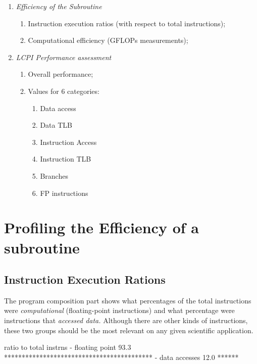 \begin{enumerate}
  \item  \emph{Efficiency of the Subroutine}
  \begin{enumerate}
    \item Instruction execution ratios (with respect to total instructions);
    \item  Computational efficiency (GFLOPs measurements);
  \end{enumerate}
  \item  \emph{LCPI Performance assessment}
  \begin{enumerate}
    \item Overall performance;
    \item  Values for 6 categories:
    \begin{enumerate}
      \item  Data access
      \item  Data TLB
      \item  Instruction Access
      \item  Instruction TLB
      \item  Branches
      \item  FP instructions
    \end{enumerate}
  \end{enumerate}
\end{enumerate}

\section{Profiling the Efficiency of a subroutine}
\label{sec:Profiling_Efficiency_of_a_subroutine}

\subsection{Instruction Execution Rations}
\label{subsec:Instruction_Execution_Ratios}

The program composition part shows what percentages of the total instructions were \emph{computational} (floating-point instructions) and what percentage were instructions that \emph{accessed data.} Although there are other kinds of instructions, these two groups should be the most relevant on any given scientific application.

\begin{prompt}
ratio to total instrns     %
- floating point       93.3 ******************************************
- data accesses        12.0 ******
\end{prompt}

